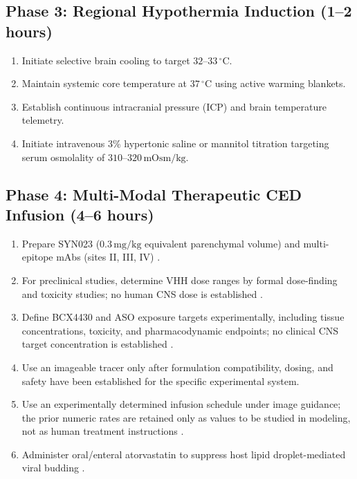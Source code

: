 \documentclass[12pt,a4paper]{article}
\begin{document}
\subsection{Phase 3: Regional Hypothermia Induction (1--2 hours)}
\begin{enumerate}
    \item Initiate selective brain cooling to target $32\text{--}33\,^{\circ}\mathrm{C}$.
    \item Maintain systemic core temperature at $37\,^{\circ}\mathrm{C}$ using active warming blankets.
    \item Establish continuous intracranial pressure (ICP) and brain temperature telemetry.
    \item Initiate intravenous 3\% hypertonic saline or mannitol titration targeting serum osmolality of $310\text{--}320\,\mathrm{mOsm/kg}$.
\end{enumerate}

\subsection{Phase 4: Multi-Modal Therapeutic CED Infusion (4--6 hours)}
\begin{enumerate}
    \item Prepare SYN023 ($0.3\,\mathrm{mg/kg}$ equivalent parenchymal volume) and multi-epitope mAbs (sites II, III, IV) \citep{liu2025syn023, ren2025synb1}.
    \item For preclinical studies, determine VHH dose ranges by formal dose-finding and toxicity studies; no human CNS dose is established \citep{terryn2016vhh}.
    \item Define BCX4430 and ASO exposure targets experimentally, including tissue concentrations, toxicity, and pharmacodynamic endpoints; no clinical CNS target concentration is established \citep{xie2023bcx}.
    \item Use an imageable tracer only after formulation compatibility, dosing, and safety have been established for the specific experimental system.
    \item Use an experimentally determined infusion schedule under image guidance; the prior numeric rates are retained only as values to be studied in modeling, not as human treatment instructions \citep{narsinh2025ced, munjal2026ced}.
    \item Administer oral/enteral atorvastatin to suppress host lipid droplet-mediated viral budding \citep{zhao2022ld}.
\end{enumerate}
\end{document}
